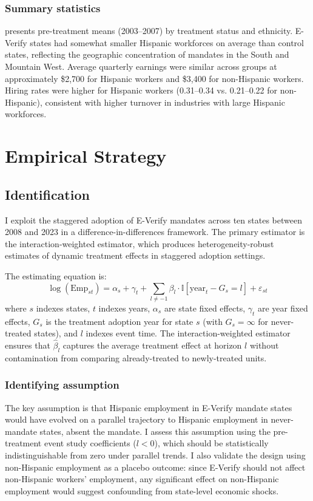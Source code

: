\documentclass[12pt]{article}
\newcommand{\ind}{\mathbb{I}}
\begin{document}
\subsubsection*{Summary statistics}  presents pre-treatment means (2003--2007) by treatment status and ethnicity. E-Verify states had somewhat smaller Hispanic workforces on average than control states, reflecting the geographic concentration of mandates in the South and Mountain West. Average quarterly earnings were similar across groups at approximately \$2,700 for Hispanic workers and \$3,400 for non-Hispanic workers. Hiring rates were higher for Hispanic workers (0.31--0.34 vs. 0.21--0.22 for non-Hispanic), consistent with higher turnover in industries with large Hispanic workforces.




\section{Empirical Strategy}

\subsection{Identification}

I exploit the staggered adoption of E-Verify mandates across ten states between 2008 and 2023 in a difference-in-differences framework. The primary estimator is the \citet{sunab2021} interaction-weighted estimator, which produces heterogeneity-robust estimates of dynamic treatment effects in staggered adoption settings.

The estimating equation is:
\begin{equation}
\log(\text{Emp}_{st}) = \alpha_s + \gamma_t + \sum_{l \neq -1} \beta_l \cdot \ind[\text{year}_t - G_s = l] + \varepsilon_{st}
\end{equation}
where $s$ indexes states, $t$ indexes years, $\alpha_s$ are state fixed effects, $\gamma_t$ are year fixed effects, $G_s$ is the treatment adoption year for state $s$ (with $G_s = \infty$ for never-treated states), and $l$ indexes event time. The interaction-weighted estimator ensures that $\hat{\beta}_l$ captures the average treatment effect at horizon $l$ without contamination from comparing already-treated to newly-treated units.

\subsubsection*{Identifying assumption} The key assumption is that Hispanic employment in E-Verify mandate states would have evolved on a parallel trajectory to Hispanic employment in never-mandate states, absent the mandate. I assess this assumption using the pre-treatment event study coefficients ($l < 0$), which should be statistically indistinguishable from zero under parallel trends. I also validate the design using non-Hispanic employment as a placebo outcome: since E-Verify should not affect non-Hispanic workers' employment, any significant effect on non-Hispanic employment would suggest confounding from state-level economic shocks.
\end{document}
